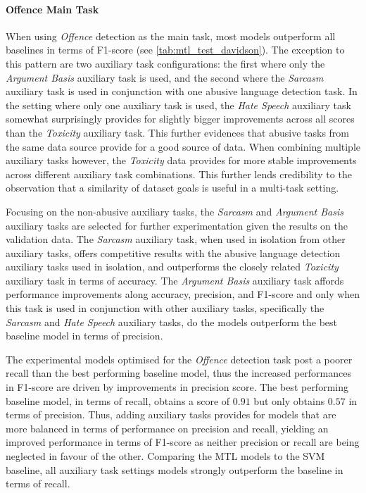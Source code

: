 \paragraph{Offence Main Task}
When using \textit{Offence} detection as the main task, most models outperform all baselines in terms of F1-score (see \cref{tab:mtl_test_davidson}).
The exception to this pattern are two auxiliary task configurations: the first where only the \textit{Argument Basis} auxiliary task is used, and the second where the \textit{Sarcasm} auxiliary task is used in conjunction with one abusive language detection task.
In the setting where only one auxiliary task is used, the \textit{Hate Speech} auxiliary task somewhat surprisingly provides for slightly bigger improvements across all scores than the \textit{Toxicity} auxiliary task.
This further evidences that abusive tasks from the same data source provide for a good source of data.
When combining multiple auxiliary tasks however, the \textit{Toxicity} data provides for more stable improvements across different auxiliary task combinations.
This further lends credibility to the observation that a similarity of dataset goals is useful in a multi-task setting.

Focusing on the non-abusive auxiliary tasks, the \textit{Sarcasm} and \textit{Argument Basis} auxiliary tasks are selected for further experimentation given the results on the validation data.
The \textit{Sarcasm} auxiliary task, when used in isolation from other auxiliary tasks, offers competitive results with the abusive language detection auxiliary tasks used in isolation, and outperforms the closely related \textit{Toxicity} auxiliary task in terms of accuracy.
The \textit{Argument Basis} auxiliary task affords performance improvements along accuracy, precision, and F1-score and only when this task is used in conjunction with other auxiliary tasks, specifically the \textit{Sarcasm} and \textit{Hate Speech} auxiliary tasks, do the models outperform the best baseline model in terms of precision.

The experimental models optimised for the \textit{Offence} detection task post a poorer recall than the best performing baseline model, thus the increased performances in F1-score are driven by improvements in precision score.
The best performing baseline model, in terms of recall, obtains a score of $0.91$ but only obtains $0.57$ in terms of precision.
Thus, adding auxiliary tasks provides for models that are more balanced in terms of performance on precision and recall, yielding an improved performance in terms of F1-score as neither precision or recall are being neglected in favour of the other.
Comparing the MTL models to the SVM baseline, all auxiliary task settings models strongly outperform the baseline in terms of recall.

